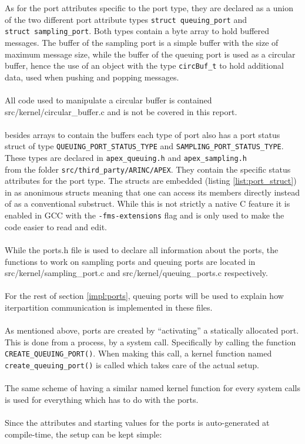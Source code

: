 As for the port attributes specific to the port type,
they are declared as a union of the two different port attribute types
\texttt{struct queuing\_port} and\\
\texttt{struct sampling\_port}.
Both types contain a byte array to hold buffered messages.
The buffer of the sampling port is a simple buffer with the size of maximum message size,
while the buffer of the queuing port is used as a circular buffer,
hence the use of an object with the type \texttt{circBuf\_t} to hold additional data,
used when pushing and popping messages.
\\\\
All code used to manipulate a circular buffer is contained src/kernel/circular\_buffer.c
and is not be covered in this report.
\\\\
besides arrays to contain the buffers each type of port also has a port status struct
of type \texttt{QUEUING\_PORT\_STATUS\_TYPE} and \texttt{SAMPLING\_PORT\_STATUS\_TYPE}.
These types are declared in \texttt{apex\_queuing.h} and \texttt{apex\_sampling.h}\\
from the folder \texttt{src/third\_party/ARINC/APEX}.
They contain the specific status attributes for the port type.
The structs are embedded (listing \ref{list:port_struct}) in as anonimous structs
meaning that one can access its members directly instead of as a conventional substruct.
While this is not strictly a native C feature it is enabled in GCC with the \texttt{-fms-extensions} flag
and is only used to make the code easier to read and edit.
\\\\
While the ports.h file is used to declare all information about the ports,
the functions to work on sampling ports and queuing ports are located in
src/kernel/sampling\_port.c and src/kernel/queuing\_ports.c respectively.
\\\\
For the rest of section \ref{impl:ports}, queuing ports will be used to explain
how iterpartition communication is implemented in these files.
\\\\
As mentioned above,
ports are created by ``activating'' a statically allocated port.
This is done from a process, by a system call.
Specifically by calling the function \texttt{CREATE\_QUEUING\_PORT()}.
When making this call, a kernel function named \texttt{create\_queuing\_port()}
is called which takes care of the actual setup.
\\\\
The same scheme of having a similar named kernel function for every system calls
is used for everything which has to do with the ports.
\\\\
Since the attributes and starting values for the ports is auto-generated at compile-time,
the setup can be kept simple:

